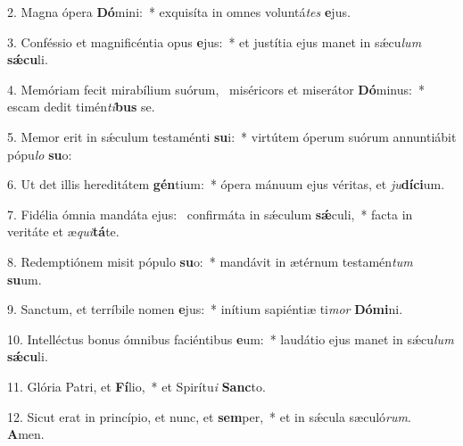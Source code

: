 2. Magna ópera \textbf{Dó}mini:~*  exquisíta in omnes voluntá\textit{tes} \textbf{e}jus.\

3. Conféssio et magnificéntia opus \textbf{e}jus:~*  et justítia ejus manet in sǽcu\textit{lum} \textbf{sǽ}\textbf{cu}li.\

4. Memóriam fecit mirabílium suórum, \dag\  miséricors et miserátor \textbf{Dó}minus:~*  escam dedit timén\textit{ti}\textbf{bus} se.\

5. Memor erit in sǽculum testaménti \textbf{su}i:~*  virtútem óperum suórum annuntiábit pópu\textit{lo} \textbf{su}o:\

6. Ut det illis hereditátem \textbf{gén}tium:~*  ópera mánuum ejus véritas, et \textit{ju}\textbf{dí}\textbf{ci}um.\

7. Fidélia ómnia mandáta ejus: \dag\  confirmáta in sǽculum \textbf{sǽ}culi,~*  facta in veritáte et æ\textit{qui}\textbf{tá}te.\

8. Redemptiónem misit pópulo \textbf{su}o:~*  mandávit in ætérnum testamén\textit{tum} \textbf{su}um.\

9. Sanctum, et terríbile nomen \textbf{e}jus:~*  inítium sapiéntiæ ti\textit{mor} \textbf{Dó}\textbf{mi}ni.\

10. Intelléctus bonus ómnibus faciéntibus \textbf{e}um:~*  laudátio ejus manet in sǽcu\textit{lum} \textbf{sǽ}\textbf{cu}li.\

11. Glória Patri, et \textbf{Fí}lio,~*  et Spirítu\textit{i} \textbf{Sanc}to.\

12. Sicut erat in princípio, et nunc, et \textbf{sem}per,~*  et in sǽcula sæculó\textit{rum}. \textbf{A}men.\

